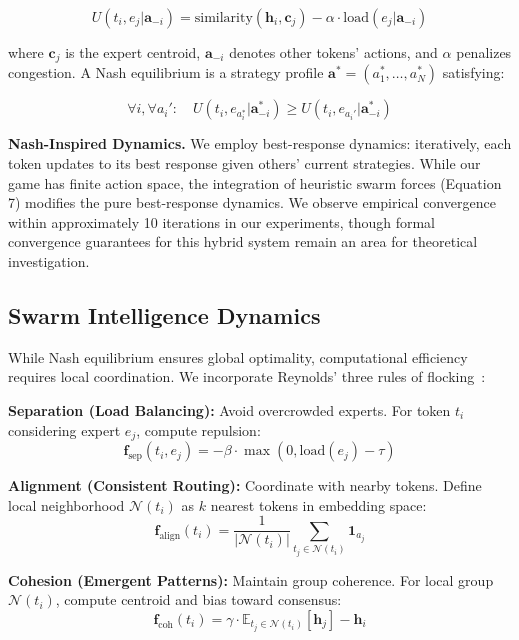 \documentclass[11pt]{article}
\begin{document}
\begin{equation}
U(t_i, e_j | \mathbf{a}_{-i}) = \text{similarity}(\mathbf{h}_i, \mathbf{c}_j) - \alpha \cdot \text{load}(e_j | \mathbf{a}_{-i})
\end{equation}

where $\mathbf{c}_j$ is the expert centroid, $\mathbf{a}_{-i}$ denotes other tokens' actions, and $\alpha$ penalizes congestion. A Nash equilibrium is a strategy profile $\mathbf{a}^* = (a_1^*, \ldots, a_N^*)$ satisfying:

\begin{equation}
\forall i, \forall a_i': \quad U(t_i, e_{a_i^*} | \mathbf{a}_{-i}^*) \geq U(t_i, e_{a_i'} | \mathbf{a}_{-i}^*)
\end{equation}

\textbf{Nash-Inspired Dynamics.} We employ best-response dynamics: iteratively, each token updates to its best response given others' current strategies. While our game has finite action space, the integration of heuristic swarm forces (Equation 7) modifies the pure best-response dynamics. We observe empirical convergence within approximately 10 iterations in our experiments, though formal convergence guarantees for this hybrid system remain an area for theoretical investigation.

\subsection{Swarm Intelligence Dynamics}

While Nash equilibrium ensures global optimality, computational efficiency requires local coordination. We incorporate Reynolds' three rules of flocking~\cite{reynolds1987flocks}:

\textbf{Separation (Load Balancing):} Avoid overcrowded experts. For token $t_i$ considering expert $e_j$, compute repulsion:
\begin{equation}
\mathbf{f}_{\text{sep}}(t_i, e_j) = -\beta \cdot \max(0, \text{load}(e_j) - \tau)
\end{equation}

\textbf{Alignment (Consistent Routing):} Coordinate with nearby tokens. Define local neighborhood $\mathcal{N}(t_i)$ as $k$ nearest tokens in embedding space:
\begin{equation}
\mathbf{f}_{\text{align}}(t_i) = \frac{1}{|\mathcal{N}(t_i)|} \sum_{t_j \in \mathcal{N}(t_i)} \mathbf{1}_{a_j}
\end{equation}

\textbf{Cohesion (Emergent Patterns):} Maintain group coherence. For local group $\mathcal{N}(t_i)$, compute centroid and bias toward consensus:
\begin{equation}
\mathbf{f}_{\text{coh}}(t_i) = \gamma \cdot \mathbb{E}_{t_j \in \mathcal{N}(t_i)}[\mathbf{h}_j] - \mathbf{h}_i
\end{equation}
\end{document}
